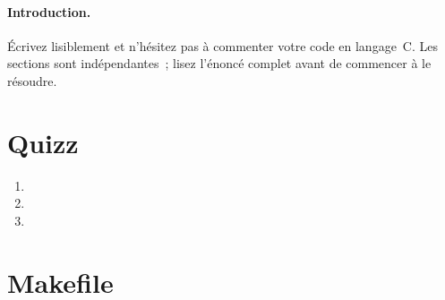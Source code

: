 \documentclass[ds]{sujet}
\begin{document}
\formation{} 
\matiere{}  
\auteur{} 
\def\SujetClsNumero{}
\paragraph{Introduction.}
\'Ecrivez lisiblement et n'h\'esitez pas \`a commenter votre code en
langage~C. Les sections sont ind\'ependantes~; lisez l'\'enonc\'e
complet avant de commencer \`a le r\'esoudre.
\section{Quizz}
\begin{enumerate}
\item
\item
\item
\end{enumerate}
\section{Makefile}




\end{document}
